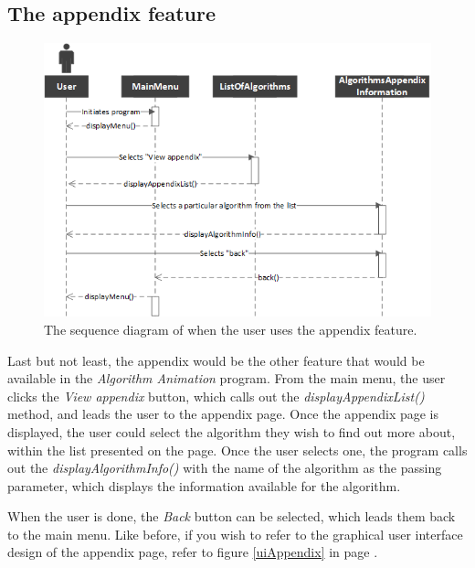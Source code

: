 \newpage

\subsection{The appendix feature}

\begin{figure}[H]
\centering
\includegraphics[scale=1]{images/report_images/sequenceDiagramAppendix.png}
\caption{The sequence diagram of when the user uses the appendix feature.}
\label{sequenceDiagramAppendix}
\end{figure}

Last but not least, the appendix would be the other feature that would be available in the \textit{Algorithm Animation} program. From the main menu, the user clicks the \textit{View appendix} button, which calls out the \textit{displayAppendixList()} method, and leads the user to the appendix page. Once the appendix page is displayed, the user could select the algorithm they wish to find out more about, within the list presented on the page. Once the user selects one, the program calls out the \textit{displayAlgorithmInfo()} with the name of the algorithm as the passing parameter, which displays the information available for the algorithm.

When the user is done, the \textit{Back} button can be selected, which leads them back to the main menu. Like before, if you wish to refer to the graphical user interface design of the appendix page, refer to figure \ref{uiAppendix} in page \pageref{uiAppendix}.

\newpage

